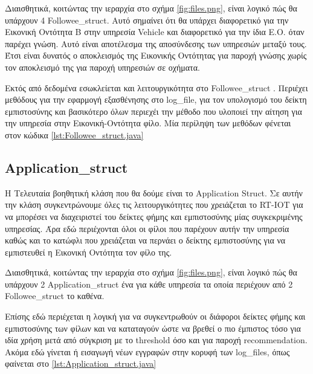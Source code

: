  Διαισθητικά, κοιτώντας την ιεραρχία στο σχήμα \ref{fig:files.png},  είναι λογικό πώς θα υπάρχουν 4 Followee\_struct. Αυτό σημαίνει 
 ότι θα υπάρχει διαφορετικό για την Εικονική Οντότητα Β στην υπηρεσία Vehicle και διαφορετικό  για την ίδια Ε.Ο. όταν παρέχει γνώση. 
 Αυτό είναι αποτέλεσμα της αποσύνδεσης των υπηρεσιών μεταξύ τους.
  Έτσι είναι δυνατός ο αποκλεισμός της Εικονικής Οντότητας για παροχή γνώσης χωρίς τον αποκλεισμό της για παροχή υπηρεσιών σε οχήματα.


Εκτός από δεδομένα εσωκλείεται και λειτουργικότητα στο Followee\_struct
. Περιέχει μεθόδους για την εφαρμογή εξασθένησης στο log\_file, για τον υπολογισμό του δείκτη εμπιστοσύνης και 
βασικότερο όλων περιεχέι την μέθοδο που υλοποιεί την αίτηση για την υπηρεσία στην Εικονική-Οντότητα φίλο.
 Μία περίληψη των μεθόδων φένεται στον κώδικα \ref{lst:Followee_struct.java}



\subsection{Application\_struct}

H Τελευταία βοηθητική κλάση που θα δούμε είναι το Application Struct. Σε αυτήν την κλάση συγκεντρώνουμε όλες τις λειτουργικότητες που χρειάζεται το RT-IOT για να μπορέσει να διαχειριστεί του δείκτες φήμης και εμπιστοσύνης μίας συγκεκριμένης υπηρεσίας. 
Άρα εδώ περιέχονται όλοι οι φίλοι που παρέχουν αυτήν την υπηρεσία καθώς και το κατώφλι που χρειάζεται να περνάει ο δείκτης εμπιστοσύνης για να εμπιστευθεί η Εικονική Οντότητα τον φίλο της. 

Διαισθητικά, κοιτώντας την ιεραρχία στο σχήμα \ref{fig:files.png},  είναι λογικό πώς θα υπάρχουν 2 Αpplication\_struct ένα για κάθε υπηρεσία τα οποία περιέχουν από 2 Followee\_struct το καθένα.

Επίσης εδώ περιέχεται η λογική για να συγκεντρωθούν οι διάφοροι δείκτες φήμης και εμπιστοσύνης των φίλων και να καταταγούν ώστε να βρεθεί ο πιο έμπιστος τόσο για ιδία χρήση μετά από σύγκριση με το threshold όσο και για παροχή recommendation.
 Ακόμα εδώ γίνεται ή εισαγωγή νέων εγγραφών στην κορυφή των log\_files, όπως φαίνεται στο \ref{lst:Application_struct.java}



